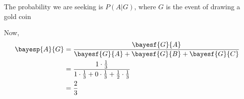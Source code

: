 \begin{solution}
    The probability we are seeking is $P(A \vert G)$, where $G$ is the event of drawing
    a gold coin
    
    Now, 
    \begin{align}
       \bayesp{A}{G} &= \dfrac{\bayesf{G}{A}}{\bayesf{G}{A} + \bayesf{G}{B} + \bayesf{G}{C}} \\
          &= \dfrac{1\cdot\frac{1}{3}}{1\cdot\frac{1}{3} + 0\cdot\frac{1}{3} 
          + \frac{1}{2}\cdot\frac{1}{3}} \\
          &= \dfrac{2}{3}
    \end{align}
\end{solution}
